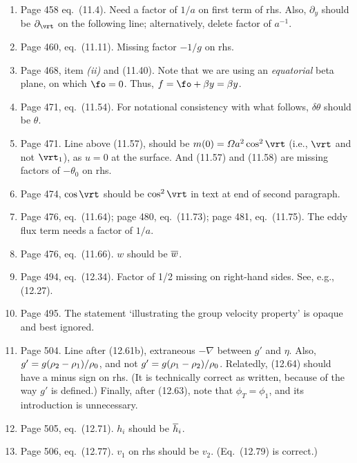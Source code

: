 \documentclass[10pt]{article}
\newcommand{\eq}{eq.\ } \newcommand{\Eq}{Eq.\ }
\begin{document}
\begin{enumerate}
\item Page 458 \eq (11.4). Need a factor of $1/a$ on first term of rhs. Also, $\partial_y$ should be $\partial_\vrt$ on the following line; alternatively, delete factor of $a^{-1}$.

\item Page 460, \eq (11.11). Missing factor $-1/g$ on rhs.

\item Page 468, item \textit{(ii)} and (11.40). Note that we are using an \textit{equatorial} beta plane, on which $\fo=0$. Thus, $f=\fo + \beta y = \beta y$.

\item Page  471, \eq (11.54). For notational consistency with what follows, $\delta \theta$ should be $\theta$. 

\item Page 471. Line above (11.57), should be $m(0) = \Omega a^2 \cos^2 \vrt$ (i.e., $\vrt$ and not $\vrt_1$), as $u=0$ at the surface. And (11.57) and (11.58) are missing factors of $-\theta_0$ on rhs.

\item Page 474, $\cos \vrt$ should be $\cos^2 \vrt$ in text at end of second paragraph.

\item Page 476, \eq (11.64); page 480, \eq (11.73);  page 481, \eq(11.75). The eddy flux term needs a factor of $1/a$.

\item Page 476, \eq (11.66). $w$ should be $\overline w$.

 \item Page 494, \eq (12.34). Factor of 1/2 missing on right-hand sides. See, e.g., (12.27). 

 \item Page 495. The statement `illustrating the group velocity property' is opaque and best ignored. 

\item Page 504. Line after (12.61b), extraneous $-\nabla$ between $g'$ and $\eta$. Also, $g' = g (\rho_2-\rho_1)/\rho_0$, and not $g' = g (\rho_1-\rho_2)/\rho_0$. Relatedly, (12.64) should have a minus sign on rhs. (It is technically correct as written, because of the way $g'$ is defined.) Finally, after (12.63), note that $\phi_T = \phi_1$, and its introduction is unnecessary.

\item Page 505, \eq(12.71). $h_i$ should be $\overline h_i$. 

\item Page 506, \eq (12.77). $v_1$ on rhs should be $v_2$. (Eq.\ (12.79) is correct.) 


\end{enumerate}
\end{document}
